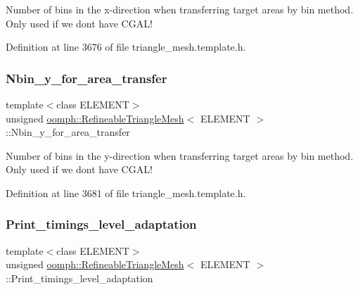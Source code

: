 Number of bins in the x-\/direction when transferring target areas by bin method. Only used if we don\textquotesingle{}t have C\+G\+A\+L! 



Definition at line 3676 of file triangle\+\_\+mesh.\+template.\+h.

\mbox{\label{classoomph_1_1RefineableTriangleMesh_af2c7213f1094f8e81e7dbd28b60cff18}} 
\subsubsection{\texorpdfstring{Nbin\+\_\+y\+\_\+for\+\_\+area\+\_\+transfer}{Nbin\_y\_for\_area\_transfer}}
{\footnotesize\ttfamily template$<$class E\+L\+E\+M\+E\+NT$>$ \\
unsigned \hyperlink{classoomph_1_1RefineableTriangleMesh}{oomph\+::\+Refineable\+Triangle\+Mesh}$<$ E\+L\+E\+M\+E\+NT $>$\+::Nbin\+\_\+y\+\_\+for\+\_\+area\+\_\+transfer\hspace{0.3cm}{\ttfamily [protected]}}



Number of bins in the y-\/direction when transferring target areas by bin method. Only used if we don\textquotesingle{}t have C\+G\+A\+L! 



Definition at line 3681 of file triangle\+\_\+mesh.\+template.\+h.

\mbox{\label{classoomph_1_1RefineableTriangleMesh_a0b8c7af317c5279a00a13aa39ea896f2}} 
\subsubsection{\texorpdfstring{Print\+\_\+timings\+\_\+level\+\_\+adaptation}{Print\_timings\_level\_adaptation}}
{\footnotesize\ttfamily template$<$class E\+L\+E\+M\+E\+NT$>$ \\
unsigned \hyperlink{classoomph_1_1RefineableTriangleMesh}{oomph\+::\+Refineable\+Triangle\+Mesh}$<$ E\+L\+E\+M\+E\+NT $>$\+::Print\+\_\+timings\+\_\+level\+\_\+adaptation\hspace{0.3cm}{\ttfamily [protected]}}



